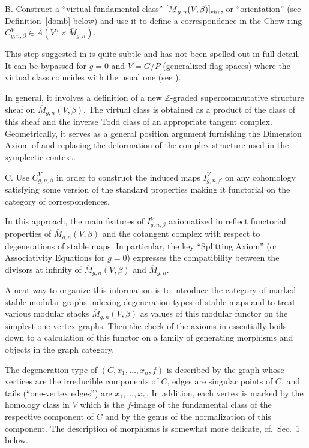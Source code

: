 \documentclass[11pt]{amsart}
\theoremstyle{definition}
\theoremstyle{remark}
\newcommand{\virt}{\mbox{\tiny virt}}
\newcommand{\zz}{{\mathbb{Z}}}
\newcommand{\ol}{\overline}
\theoremstyle{plain}
\theoremstyle{definition}
\theoremstyle{remark}
\begin{document}
\medskip

B. Construct a ``virtual fundamental class'' \([\ol{M}_{g,n}(V,\beta)]_{\virt}\),
or ``orientation'' (see
Definition~\ref{domb} below) and use it to define a correspondence in the Chow
ring \(C^V_{g,n,\beta}\in A(V^n\times
\ol{M}_{g,n})\).

\smallskip

This step suggested in \cite{K} is quite subtle and has not been spelled out in
full detail. It can be bypassed for
\(g=0\) and \(V=G/P\) (generalized flag spaces) where the virtual class coincides
with the usual one (see \cite{KM}).

\smallskip

In general, it involves a definition of a new \(\zz\)-graded supercommutative
structure sheaf on \(\ol{M}_{g,n}(V,\beta)\).
The virtual class is obtained as a product of the class of this sheaf and the
inverse Todd class of an appropriate
tangent complex. Geometrically, it serves as a general position argument
furnishing the Dimension Axiom of \cite{KM} and
replacing the deformation of the complex structure used in the symplectic
context.

\medskip

C. Use \(C^V_{g,n,\beta}\) in order to construct the induced maps
\(I^V_{g,n,\beta}\) on any cohomology satisfying some
version of the standard properties making it functorial on the category of
correspondences.

\medskip

In this approach, the main features of \(I^V_{g,n,\beta}\) axiomatized in
\cite{KM} reflect functorial properties of
\(\ol{M}_{g,n}(V,\beta)\) and the cotangent complex with respect to degenerations
of stable maps. In particular, the key
``Splitting Axiom'' (or Associativity Equations for \(g=0\)) expresses the
compatibility between the divisors at infinity
of \(\ol{M}_{g,n}(V,\beta)\) and \(\ol{M}_{g,n}.\)

\smallskip

A neat way to organize this information is to introduce the category of marked
stable modular graphs indexing
degeneration types of stable maps and to treat various modular stacks
\(\ol{M}_{g,n}(V,\beta)\) as values of this modular
functor on the simplest one-vertex graphs. Then the check of the axioms in
\cite{KM} essentially boils down to a
calculation of this functor on a family of generating morphisms and objects in
the graph category.

\smallskip

The degeneration type of \((C,x_1,\dots ,x_n, f)\) is described by the graph
whose vertices are the irreducible components
of \(C\), edges are singular points of \(C\), and tails (``one-vertex edges'') are
\(x_1,\dots ,x_n.\) In addition, each
vertex is marked by the homology class in \(V\) which is the \(f\)-image of the
fundamental class of the respective
component of \(C\) and by the genus of the normalization of this component. The
description of morphisms is somewhat more
delicate, cf.\ Sec.\ 1 below.
\end{document}
